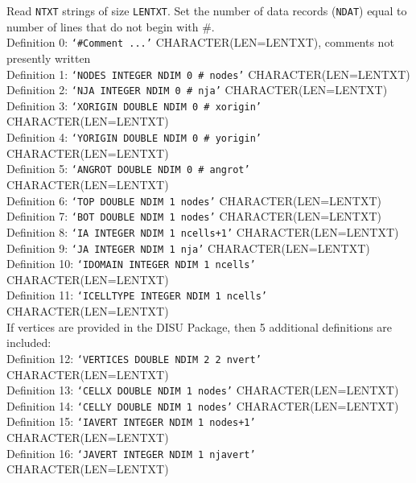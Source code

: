 \vspace{5mm}
\noindent Read \texttt{NTXT} strings of size \texttt{LENTXT}. Set the number of data records (\texttt{NDAT}) equal to number of lines that do not begin with \#.  \\
\noindent Definition 0: \texttt{`\#Comment ...'} {\color{red} \footnotesize{CHARACTER(LEN=LENTXT)}, comments not presently written} \\
\noindent Definition 1: \texttt{`NODES INTEGER NDIM 0 \# nodes'} {\color{red} \footnotesize{CHARACTER(LEN=LENTXT)}} \\
\noindent Definition 2: \texttt{`NJA INTEGER NDIM 0 \# nja'} {\color{red} \footnotesize{CHARACTER(LEN=LENTXT)}} \\
\noindent Definition 3: \texttt{`XORIGIN DOUBLE NDIM 0 \# xorigin'} {\color{red} \footnotesize{CHARACTER(LEN=LENTXT)}} \\
\noindent Definition 4: \texttt{`YORIGIN DOUBLE NDIM 0 \# yorigin'} {\color{red} \footnotesize{CHARACTER(LEN=LENTXT)}} \\
\noindent Definition 5: \texttt{`ANGROT DOUBLE NDIM 0 \# angrot'} {\color{red} \footnotesize{CHARACTER(LEN=LENTXT)}} \\
\noindent Definition 6: \texttt{`TOP DOUBLE NDIM 1 nodes'} {\color{red} \footnotesize{CHARACTER(LEN=LENTXT)}} \\
\noindent Definition 7: \texttt{`BOT DOUBLE NDIM 1 nodes'} {\color{red} \footnotesize{CHARACTER(LEN=LENTXT)}} \\
\noindent Definition 8: \texttt{`IA INTEGER NDIM 1 ncells+1'} {\color{red} \footnotesize{CHARACTER(LEN=LENTXT)}} \\
\noindent Definition 9: \texttt{`JA INTEGER NDIM 1 nja'} {\color{red} \footnotesize{CHARACTER(LEN=LENTXT)}} \\
\noindent Definition 10: \texttt{`IDOMAIN INTEGER NDIM 1 ncells'} {\color{red} \footnotesize{CHARACTER(LEN=LENTXT)}} \\
\noindent Definition 11: \texttt{`ICELLTYPE INTEGER NDIM 1 ncells'} {\color{red} \footnotesize{CHARACTER(LEN=LENTXT)}} \\

\vspace{5mm}
\noindent If vertices are provided in the DISU Package, then 5 additional definitions are included: \\
\noindent Definition 12: \texttt{`VERTICES DOUBLE NDIM 2 2 nvert'} {\color{red} \footnotesize{CHARACTER(LEN=LENTXT)}} \\
\noindent Definition 13: \texttt{`CELLX DOUBLE NDIM 1 nodes'} {\color{red} \footnotesize{CHARACTER(LEN=LENTXT)}} \\
\noindent Definition 14: \texttt{`CELLY DOUBLE NDIM 1 nodes'} {\color{red} \footnotesize{CHARACTER(LEN=LENTXT)}} \\
\noindent Definition 15: \texttt{`IAVERT INTEGER NDIM 1 nodes+1'} {\color{red} \footnotesize{CHARACTER(LEN=LENTXT)}} \\
\noindent Definition 16: \texttt{`JAVERT INTEGER NDIM 1 njavert'} {\color{red} \footnotesize{CHARACTER(LEN=LENTXT)}} \\

